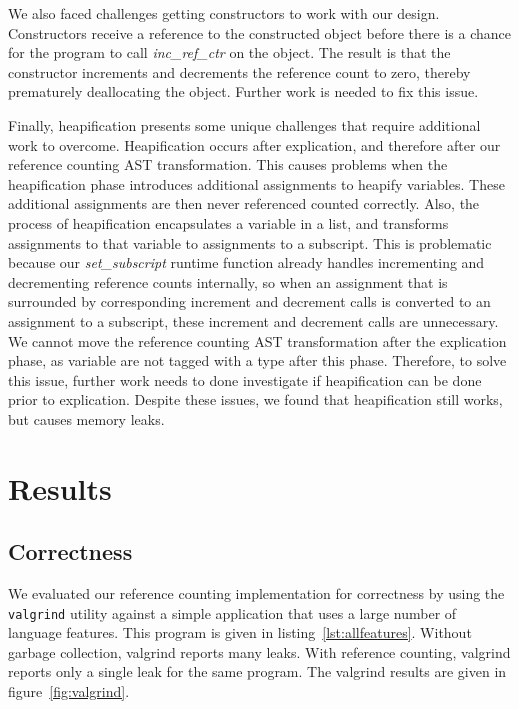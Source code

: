 \documentclass{sigplanconf}
\newcommand{\afunction}[1]{\textit{#1}}
\begin{document}
We also faced challenges getting constructors to work with our design.  Constructors receive a reference to the constructed object before there is a chance for the program to call \afunction{inc\_ref\_ctr} on the object.  The result is that the constructor increments and decrements the reference count to zero, thereby prematurely deallocating the object.  Further work is needed to fix this issue.

Finally, heapification presents some unique challenges that require additional work to overcome.  Heapification occurs after explication, and therefore after our reference counting AST transformation.  This causes problems when the heapification phase introduces additional assignments to heapify variables.  These additional assignments are then never referenced counted correctly.  Also, the process of heapification encapsulates a variable in a list, and transforms assignments to that variable to assignments to a subscript.  This is problematic because our \afunction{set\_subscript} runtime function already handles incrementing and decrementing reference counts internally, so when an assignment that is surrounded by corresponding increment and decrement calls is converted to an assignment to a subscript, these increment and decrement calls are unnecessary.  We cannot move the reference counting AST transformation after the explication phase, as variable are not tagged with a type after this phase.  Therefore, to solve this issue, further work needs to done investigate if heapification can be done prior to explication.  Despite these issues, we found that heapification still works, but causes memory leaks.

\section{Results}
\label{sec:results}

\subsection{Correctness}
We evaluated our reference counting implementation for correctness by using the \texttt{valgrind} utility against a simple application that uses a large number of language features.  This program is given in listing~\ref{lst:allfeatures}.  Without garbage collection, valgrind reports many leaks.  With reference counting, valgrind reports only a single leak for the same program.  The valgrind results are given in figure~\ref{fig:valgrind}.
\end{document}
